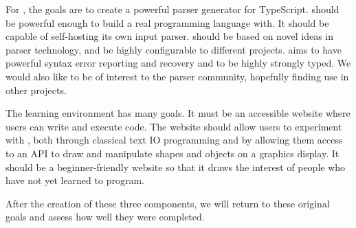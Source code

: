 For \tsPEG{}, the goals are to create a powerful parser generator for TypeScript. \tsPEG{} should be powerful enough to build a real programming language with. It should be capable of self-hosting its own input parser. \tsPEG{} should be based on novel ideas in parser technology, and be highly configurable to different projects. \tsPEG{} aims to have powerful syntax error reporting and recovery and to be highly strongly typed. We would also like \tsPEG{} to be of interest to the parser community, hopefully finding use in other projects.

The learning environment has many goals. It must be an accessible website where users can write and execute \Setanta{} code. The website should allow users to experiment with \Setanta{}, both through classical text IO programming and by allowing them access to an API to draw and manipulate shapes and objects on a graphics display. It should be a beginner-friendly website so that it draws the interest of people who have not yet learned to program.

After the creation of these three components, we will return to these original goals and assess how well they were completed.

